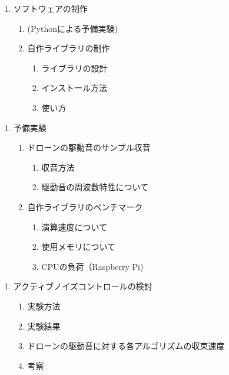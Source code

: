 \documentclass[
]{jsarticle}
\providecommand{\tightlist}{%
  \setlength{\itemsep}{0pt}\setlength{\parskip}{0pt}}
\begin{document}
\begin{enumerate}
\def\labelenumi{\arabic{enumi}.}
\setcounter{enumi}{3}
\tightlist
\item
  ソフトウェアの制作

  \begin{enumerate}
  \def\labelenumii{\arabic{enumii}.}
  \tightlist
  \item
    (Pythonによる予備実験)
  \item
    自作ライブラリの制作

    \begin{enumerate}
    \def\labelenumiii{\arabic{enumiii}.}
    \tightlist
    \item
      ライブラリの設計
    \item
      インストール方法
    \item
      使い方
    \end{enumerate}
  \end{enumerate}
\end{enumerate}

\begin{enumerate}
\def\labelenumi{\arabic{enumi}.}
\setcounter{enumi}{4}
\tightlist
\item
  予備実験

  \begin{enumerate}
  \def\labelenumii{\arabic{enumii}.}
  \tightlist
  \item
    ドローンの駆動音のサンプル収音

    \begin{enumerate}
    \def\labelenumiii{\arabic{enumiii}.}
    \tightlist
    \item
      収音方法
    \item
      駆動音の周波数特性について
    \end{enumerate}
  \item
    自作ライブラリのベンチマーク

    \begin{enumerate}
    \def\labelenumiii{\arabic{enumiii}.}
    \tightlist
    \item
      演算速度について
    \item
      使用メモリについて
    \item
      CPUの負荷（Raspberry Pi)
    \end{enumerate}
  \end{enumerate}
\end{enumerate}

\begin{enumerate}
\def\labelenumi{\arabic{enumi}.}
\setcounter{enumi}{5}
\tightlist
\item
  アクティブノイズコントロールの検討

  \begin{enumerate}
  \def\labelenumii{\arabic{enumii}.}
  \tightlist
  \item
    実験方法
  \item
    実験結果
  \item
    ドローンの駆動音に対する各アルゴリズムの収束速度
  \item
    考察
  \end{enumerate}
\end{enumerate}
\end{document}
